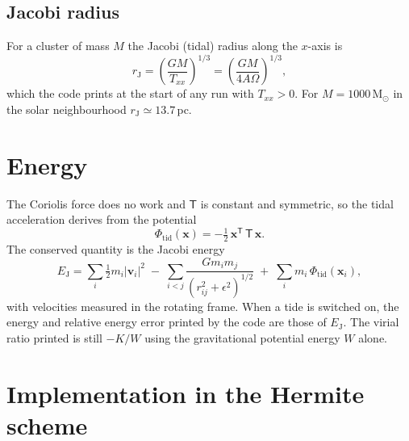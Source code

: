 \documentclass[11pt,a4paper]{article}
\newcommand{\bx}{\mathbf{x}}
\newcommand{\bv}{\mathbf{v}}
\newcommand{\T}{\mathsf{T}}
\begin{document}
\subsection{Jacobi radius}
For a cluster of mass $M$ the Jacobi (tidal) radius along the $x$-axis
is
\begin{equation}
  r_{\mathrm J} = \left(\frac{GM}{T_{xx}}\right)^{1/3}
  = \left(\frac{GM}{4A\Omega}\right)^{1/3},
\end{equation}
which the code prints at the start of any run with $T_{xx}>0$. For
$M = 1000\,\mathrm{M_\odot}$ in the solar neighbourhood
$r_{\mathrm J} \simeq 13.7$\,pc.

\section{Energy}

The Coriolis force does no work and $\T$ is constant and symmetric, so
the tidal acceleration derives from the potential
\begin{equation}
  \Phi_{\mathrm{tid}}(\bx) = -\tfrac12\,\bx^{\mathsf T}\,\T\,\bx .
\end{equation}
The conserved quantity is the Jacobi energy
\begin{equation}
  E_{\mathrm J} = \sum_i \tfrac12 m_i |\bv_i|^2
   \;-\; \sum_{i<j}\frac{G m_i m_j}{\left(r_{ij}^2+\epsilon^2\right)^{1/2}}
   \;+\; \sum_i m_i\,\Phi_{\mathrm{tid}}(\bx_i),
\end{equation}
with velocities measured in the rotating frame. When a tide is
switched on, the energy and relative energy error printed by the code
are those of $E_{\mathrm J}$. The virial ratio printed is still
$-K/W$ using the gravitational potential energy $W$ alone.

\section{Implementation in the Hermite scheme}
\end{document}

